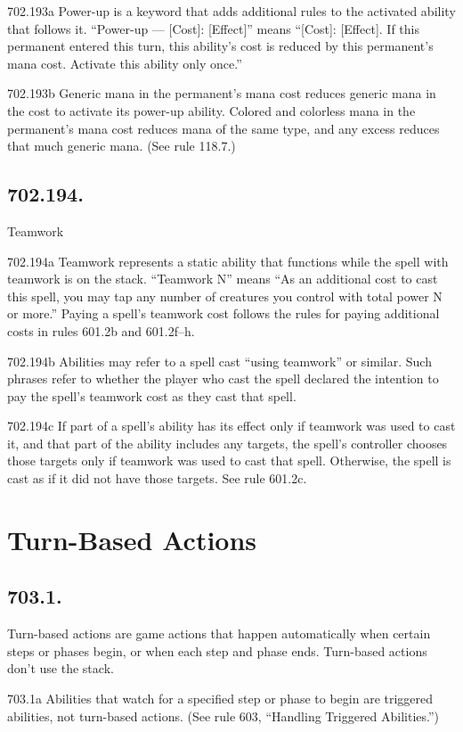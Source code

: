 702.193a Power-up is a keyword that adds additional rules to the activated ability that follows it. “Power-up — [Cost]: [Effect]” means “[Cost]: [Effect]. If this permanent entered this turn, this ability’s cost is reduced by this permanent’s mana cost. Activate this ability only once.”

702.193b Generic mana in the permanent’s mana cost reduces generic mana in the cost to activate its power-up ability. Colored and colorless mana in the permanent’s mana cost reduces mana of the same type, and any excess reduces that much generic mana. (See rule 118.7.)

\subsection*{702.194.}
Teamwork

702.194a Teamwork represents a static ability that functions while the spell with teamwork is on the stack. “Teamwork N” means “As an additional cost to cast this spell, you may tap any number of creatures you control with total power N or more.” Paying a spell’s teamwork cost follows the rules for paying additional costs in rules 601.2b and 601.2f–h.

702.194b Abilities may refer to a spell cast “using teamwork” or similar. Such phrases refer to whether the player who cast the spell declared the intention to pay the spell’s teamwork cost as they cast that spell.

702.194c If part of a spell’s ability has its effect only if teamwork was used to cast it, and that part of the ability includes any targets, the spell’s controller chooses those targets only if teamwork was used to cast that spell. Otherwise, the spell is cast as if it did not have those targets. See rule 601.2c.

\section{Turn-Based Actions}
\subsection*{703.1.}
Turn-based actions are game actions that happen automatically when certain steps or phases begin, or when each step and phase ends. Turn-based actions don’t use the stack.

703.1a Abilities that watch for a specified step or phase to begin are triggered abilities, not turn-based actions. (See rule 603, “Handling Triggered Abilities.”)

